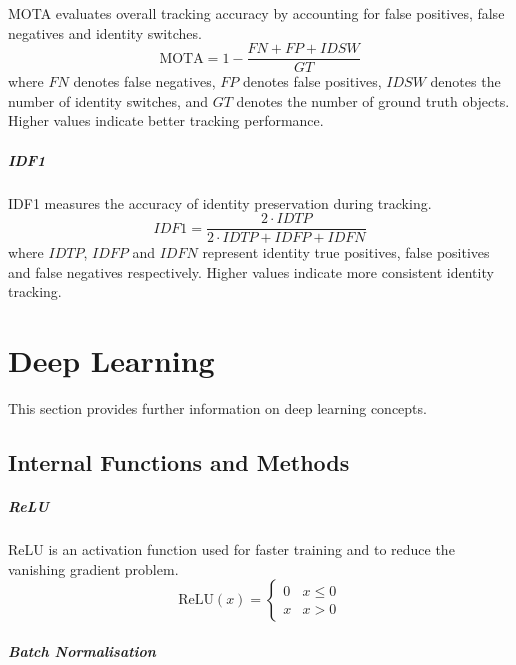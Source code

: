 \documentclass[author={Jacob Stephenson},
    degree={BSc},
    title={Robust Great Ape Species Detection in Wild Camera Trap Imagery with Promptable Concept Segmentation},
    unit={COMS30045},
    subtitle={}]{dissertation}
\begin{document}
MOTA evaluates overall tracking accuracy by accounting for false positives, false negatives and identity switches.
\begin{equation}
    \text{MOTA} =
    1 - \frac{FN + FP + IDSW}
    {GT}
\end{equation}
where $FN$ denotes false negatives, $FP$ denotes false positives, $IDSW$ denotes the number of identity switches, and $GT$ denotes the number of ground truth objects. Higher values indicate better tracking performance.


\paragraph{IDF1}

IDF1 measures the accuracy of identity preservation during tracking.
\begin{equation}
    IDF1 = 
    \frac{2 \cdot IDTP}
    {2 \cdot IDTP + IDFP + IDFN}
\end{equation}
where $IDTP$, $IDFP$ and $IDFN$ represent identity true positives, false positives and false negatives respectively. Higher values indicate more consistent identity tracking.


\chapter{Deep Learning}
\label{appx:deeplearning}

This section provides further information on deep learning concepts.

\section{Internal Functions and Methods}
\label{appx:dl_functions}

\paragraph{ReLU}

ReLU is an activation function used for faster training and to reduce the vanishing gradient problem.
\begin{equation}
    \text{ReLU}(x) = 
    \begin{cases}
        0 & x \leq 0 \\
        x & x > 0
    \end{cases}
\end{equation}


\paragraph{Batch Normalisation}
\end{document}
